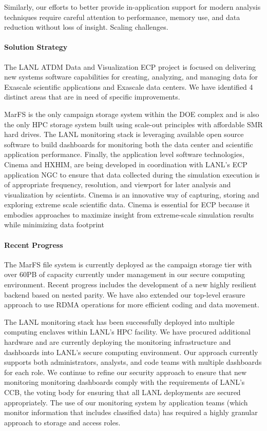 Similarly, our efforts to better provide in-application support for modern
analysis techniques require careful attention to performance, memory use, and
data reduction without loss of insight. 
Scaling challenges.

\paragraph{Solution Strategy}
The LANL ATDM Data and Visualization ECP project is focused on delivering new
systems software capabilities for creating, analyzing, and managing data for
Exascale scientific applications and Exascale data centers. We have identified
4 distinct areas that are in need of specific improvements.

MarFS is the only campaign storage system within the DOE complex and is
also the only HPC storage system built using scale-out principles with affordable
SMR hard drives. The LANL monitoring stack is leveraging available open source
software to build dashboards for monitoring both the data center and
scientific application performance. Finally, the application level software
technologies, Cinema and HXHIM, are being developed in coordination with
LANL's ECP application NGC to ensure that data collected during the simulation
execution is of appropriate frequency, resolution, and viewport for later
analysis and visualization by scientists. Cinema is an innovative way of
capturing, storing and exploring extreme scale scientific data. Cinema is
essential for ECP because it embodies approaches to maximize insight from
extreme-scale simulation results while minimizing data footprint 

\paragraph{Recent Progress}
The MarFS file system is currently deployed as the campaign storage tier
with over 60PB of capacity currently under management in our secure computing
environment. Recent progress includes the development of a new highly
resilient backend based on nested parity. We have also extended our top-level
erasure approach to use RDMA operations for more efficient coding and data movement.

The LANL monitoring stack has been successfully deployed into multiple
computing enclaves within LANL's HPC facility. We have procured additional
hardware and are currently deploying the monitoring infrastructure and
dashboards into LANL's secure computing environment. Our approach currently
supports both administrators, analysts, and code teams with multiple
dashboards for each role. We continue to refine our security approach to
ensure that new monitoring monitoring dashboards comply with the requirements
of LANL's CCB, the voting body for ensuring that all LANL deployments are
secured appropriately. The use of our monitoring system by application teams
(which monitor information that includes classified data) has required a
highly granular approach to storage and access roles.

